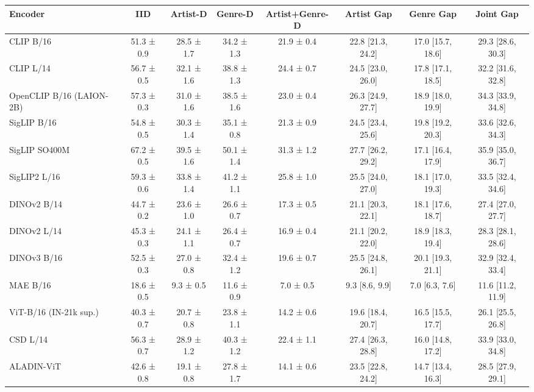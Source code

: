 \begin{tabular}{lccccccc}
\toprule
Encoder & IID & Artist-D & Genre-D & Artist+Genre-D & Artist Gap & Genre Gap & Joint Gap \\
\midrule
CLIP B/16 & 51.3 ± 0.9 & 28.5 ± 1.7 & 34.2 ± 1.3 & 21.9 ± 0.4 & 22.8 [21.3, 24.2] & 17.0 [15.7, 18.6] & 29.3 [28.6, 30.3] \\
CLIP L/14 & 56.7 ± 0.5 & 32.1 ± 1.6 & 38.8 ± 1.3 & 24.4 ± 0.7 & 24.5 [23.0, 26.0] & 17.8 [17.1, 18.5] & 32.2 [31.6, 32.8] \\
OpenCLIP B/16 (LAION-2B) & 57.3 ± 0.3 & 31.0 ± 1.6 & 38.5 ± 1.6 & 23.0 ± 0.4 & 26.3 [24.9, 27.7] & 18.9 [18.0, 19.9] & 34.3 [33.9, 34.8] \\
SigLIP B/16 & 54.8 ± 0.5 & 30.3 ± 1.4 & 35.1 ± 0.8 & 21.3 ± 0.9 & 24.5 [23.4, 25.6] & 19.8 [19.2, 20.3] & 33.6 [32.6, 34.3] \\
SigLIP SO400M & 67.2 ± 0.5 & 39.5 ± 1.6 & 50.1 ± 1.4 & 31.3 ± 1.2 & 27.7 [26.2, 29.2] & 17.1 [16.4, 17.9] & 35.9 [35.0, 36.7] \\
SigLIP2 L/16 & 59.3 ± 0.6 & 33.8 ± 1.4 & 41.2 ± 1.1 & 25.8 ± 1.0 & 25.5 [24.0, 27.0] & 18.1 [17.0, 19.3] & 33.5 [32.4, 34.6] \\
DINOv2 B/14 & 44.7 ± 0.2 & 23.6 ± 1.0 & 26.6 ± 0.7 & 17.3 ± 0.5 & 21.1 [20.3, 22.1] & 18.1 [17.6, 18.7] & 27.4 [27.0, 27.7] \\
DINOv2 L/14 & 45.3 ± 0.3 & 24.1 ± 1.1 & 26.4 ± 0.7 & 16.9 ± 0.4 & 21.1 [20.2, 22.0] & 18.9 [18.3, 19.4] & 28.3 [28.1, 28.6] \\
DINOv3 B/16 & 52.5 ± 0.3 & 27.0 ± 0.8 & 32.4 ± 1.2 & 19.6 ± 0.7 & 25.5 [24.8, 26.1] & 20.1 [19.3, 21.1] & 32.9 [32.4, 33.4] \\
MAE B/16 & 18.6 ± 0.5 & 9.3 ± 0.5 & 11.6 ± 0.9 & 7.0 ± 0.5 & 9.3 [8.6, 9.9] & 7.0 [6.3, 7.6] & 11.6 [11.2, 11.9] \\
ViT-B/16 (IN-21k sup.) & 40.3 ± 0.7 & 20.7 ± 0.8 & 23.8 ± 1.1 & 14.2 ± 0.6 & 19.6 [18.4, 20.7] & 16.5 [15.5, 17.7] & 26.1 [25.5, 26.8] \\
CSD L/14 & 56.3 ± 0.7 & 28.9 ± 1.2 & 40.3 ± 1.2 & 22.4 ± 1.1 & 27.4 [26.3, 28.8] & 16.0 [14.8, 17.2] & 33.9 [33.0, 34.8] \\
ALADIN-ViT & 42.6 ± 0.8 & 19.1 ± 0.8 & 27.8 ± 1.7 & 14.1 ± 0.6 & 23.5 [22.8, 24.2] & 14.7 [13.4, 16.3] & 28.5 [27.9, 29.1] \\
\bottomrule
\end{tabular}
